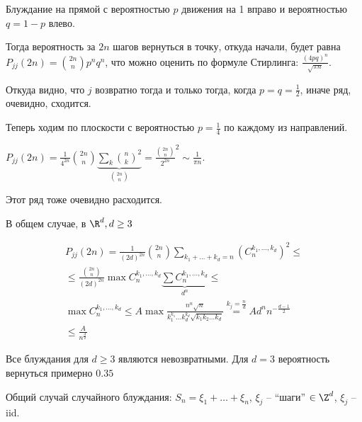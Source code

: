 \begin{exmp}
Блуждание на прямой с вероятностью $p$ движения на 1 вправо и вероятностью $q = 1 - p$ влево.

Тогда вероятность за $2n$ шагов вернуться в точку, откуда начали, будет равна $P_{jj}(2n) = {2n \choose n} p^n q^n$, что можно оценить по формуле Стирлинга:
$\frac{(4pq)^n}{\sqrt{\pi n}}$. 

Откуда видно, что $j$ возвратно тогда и только тогда, когда $p = q = \frac12$, иначе ряд, очевидно, сходится.
\end{exmp}
\begin{exmp}
Теперь ходим по плоскости с вероятностью $p = \frac14$ по каждому из направлений.

$P_{jj}(2n) = \frac{1}{4^{2n}} {2n \choose n} \underbrace{\sum\limits_k {n \choose k}^2}_{{2n \choose n}} = \frac{{2n \choose n}}{2^{2n}}^2 \sim \frac{1}{\pi n}$.

Этот ряд тоже очевидно расходится.
\end{exmp}
\begin{exmp}
В общем случае, в $\R^d, d \geq 3$

\begin{gather*} 
P_{jj}(2n) = \frac{1}{(2d)^{2n}} {2n \choose n} \sum\limits_{k_1 + \dots + k_d = n} (C_n^{k_1, \dots, k_d})^2 \leq \\
\leq \frac{{2n \choose n}}{(2d)^{2n}} \max C_n^{k_1, \dots, k_d} \underbrace{\sum C_n^{k_1, \dots, k_d}}_{d^n} \leq \\
\max C_n^{k_1, \dots, k_d} \leq A \max \frac{n^n \sqrt{n}}{k_1^{k_1} \dots k_d^{k_d} \sqrt{k_1 k_2 \dots k_d}} \stackrel{k_j = \frac{n}{d}}{=}  A d^n n^{-\frac{d-1}{2}} \\
\leq \frac{A}{n^{\frac{d}{2}}}
\end{gather*}

Все блуждания для $d \geq 3$ являются невозвратными.
Для $d=3$ вероятность вернуться примерно $0.35$
\end{exmp}

Общий случай случайного блуждания: $S_n = \xi_1 + \dots + \xi_n$, $\xi_j$ -- ``шаги'' $\in \Z^d$, $\xi_j$ -- iid.

